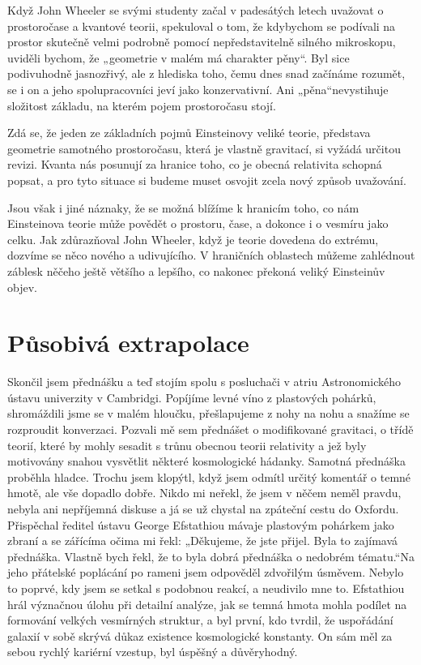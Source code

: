   Když John Wheeler se svými studenty začal v padesátých letech uvažovat o prostoročase a kvantové
  teorii, spekuloval o tom, že kdybychom se podívali na prostor skutečně velmi podrobně pomocí
  nepředstavitelně silného mikroskopu, uviděli bychom, že „geometrie v malém má charakter pěny“. Byl
  sice podivuhodně jasnozřivý, ale z hlediska toho, čemu dnes snad začínáme rozumět, se i on a jeho
  spolupracovníci jeví jako konzervativní. Ani „pěna“nevystihuje složitost základu, na kterém pojem
  prostoročasu stojí. 
  
  Zdá se, že jeden ze základních pojmů Einsteinovy veliké teorie, představa geometrie samotného
  prostoročasu, která je vlastně gravitací, si vyžádá určitou revizi. Kvanta nás posunují za hranice
  toho, co je obecná relativita schopná popsat, a pro tyto situace si budeme muset osvojit zcela
  nový způsob uvažování. 
  
  Jsou však i jiné náznaky, že se možná blížíme k hranicím toho, co nám Einsteinova teorie může
  povědět o prostoru, čase, a dokonce i o vesmíru jako celku. Jak zdůrazňoval John Wheeler, když je
  teorie dovedena do extrému, dozvíme se něco nového a udivujícího. V hraničních oblastech můžeme
  zahlédnout záblesk něčeho ještě většího a lepšího, co nakonec překoná veliký Einsteinův objev.

\section{Působivá extrapolace}\label{feyIchIIIsecXIV}
  Skončil jsem přednášku a teď stojím spolu s posluchači v atriu Astronomického ústavu univerzity v
  Cambridgi. Popíjíme levné víno z plastových pohárků, shromáždili jsme se v malém hloučku,
  přešlapujeme z nohy na nohu a snažíme se rozproudit konverzaci. Pozvali mě sem přednášet o
  modifikované gravitaci, o třídě teorií, které by mohly sesadit s trůnu obecnou teorii relativity a
  jež byly motivovány snahou vysvětlit některé kosmologické hádanky. Samotná přednáška proběhla
  hladce. Trochu jsem klopýtl, když jsem odmítl určitý komentář o temné hmotě, ale vše dopadlo
  dobře. Nikdo mi neřekl, že jsem v něčem neměl pravdu, nebyla ani nepříjemná diskuse a já se už
  chystal na zpáteční cestu do Oxfordu. Přispěchal ředitel ústavu George Efstathiou mávaje plastovým
  pohárkem jako zbraní a se zářícíma očima mi řekl: „Děkujeme, že jste přijel. Byla to zajímavá
  přednáška. Vlastně bych řekl, že to byla dobrá přednáška o nedobrém tématu.“Na jeho přátelské
  poplácání po rameni jsem odpověděl zdvořilým úsměvem. Nebylo to poprvé, kdy jsem se setkal s
  podobnou reakcí, a neudivilo mne to. Efstathiou hrál význačnou úlohu při detailní analýze, jak se
  temná hmota mohla podílet na formování velkých vesmírných struktur, a byl první, kdo tvrdil, že
  uspořádání galaxií v sobě skrývá důkaz existence kosmologické konstanty. On sám měl za sebou
  rychlý kariérní vzestup, byl úspěšný a důvěryhodný. 
  
